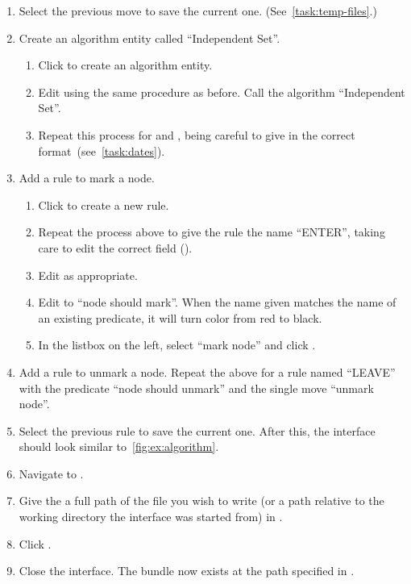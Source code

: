 \begin{enumerate}
\item Select the previous move to save the current one.
  (See~\autoref{task:temp-files}.)
\item Create an algorithm entity called \enquote{Independent Set}.
\begin{enumerate}
\item Click  to create an algorithm entity.
\item Edit  using the same procedure as before.
  Call the algorithm \enquote{Independent Set}.
\item Repeat this process for  and ,
  being careful to give  in the correct format~(see~\autoref{task:dates}).
\end{enumerate}
\item Add a rule to mark a node.
  \begin{enumerate}
  \item Click  to create a new rule.
  \item Repeat the process above to give the rule the name
    \enquote{ENTER}, taking care to edit the correct field
    ().
  \item Edit  as appropriate.
  \item Edit  to \enquote{node
      should mark}.  When the name given matches the name of an
    existing predicate, it will turn color from red to black.
  \item In the listbox on the left, select \enquote{mark node} and
    click .
  \end{enumerate}
\item Add a rule to unmark a node.  Repeat the above for a rule named
  \enquote{LEAVE} with the predicate \enquote{node should unmark} and
  the single move \enquote{unmark node}.
\item Select the previous rule to save the current one.
  After this, the interface should look similar to~\autoref{fig:ex:algorithm}.
\item Navigate to .
\item Give the a full path of the file you wish to write
  (or a path relative to the working directory the interface was started from)
  in .
\item Click .
\item Close the interface.
  The bundle now exists at the path specified in .
\end{enumerate}

